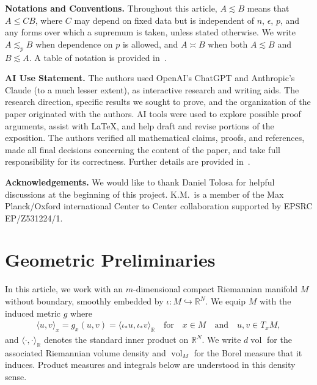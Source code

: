 \documentclass[11pt,reqno]{amsproc}
\numberwithin{equation}{section}
\newcommand{\R}{\mathbb{R}}
\newcommand{\ls}{\lesssim}
\newcommand{\vol}{\operatorname{vol}}
\newcommand{\dvol}{d\!\vol}
\newcommand{\andd}{\quad \text{and} \quad}
\theoremstyle{definition}
\theoremstyle{plain}
\begin{document}
\label{not:global_conventions}
\textbf{Notations and Conventions.}
    Throughout this article, $A\ls B$ means that $A\leq CB$, where $C$ may depend on fixed data but is independent of $n$, $\epsilon$, $p$, and any forms over which a supremum is taken, unless stated otherwise. We write $A\ls_p B$ when dependence on $p$ is allowed, and $A\asymp B$ when both $A\ls B$ and $B\ls A$. A table of notation is provided in~. \medskip


\textbf{AI Use Statement.}
The authors used OpenAI’s ChatGPT and Anthropic's Claude (to a much lesser extent), as interactive research and writing aids. The research direction, specific results we sought to prove, and the organization of the paper originated with the authors. AI tools were used to explore possible proof arguments, assist with \LaTeX, and help draft and revise portions of the exposition. The authors verified all mathematical claims, proofs, and references, made all final decisions concerning the content of the paper, and take full responsibility for its correctness. Further details are provided in~.\medskip



    \textbf{Acknowledgements.}
    We would like to thank Daniel Tolosa for helpful discussions at the beginning of this project. K.M.~is a member of the Max Planck/Oxford international Center to Center collaboration supported by EPSRC EP/Z531224/1.


    \section{Geometric Preliminaries} \label{sec:geometric_prelim}

    In this article, we work with an $m$-dimensional compact Riemannian manifold $M$ without boundary, smoothly embedded by $\iota: M \hookrightarrow \R^N$. We equip $M$ with the induced metric $g$ where
    \begin{align} \label{eq:riemannian_metric}
        \langle u, v \rangle_x = g_x(u,v) = \langle \iota_* u, \iota_* v \rangle_\R \quad \text{for} \quad x \in M \andd u, v \in T_x M,
    \end{align}
    and $\langle \cdot , \cdot \rangle_\R$ denotes the standard inner product on $\R^N$. We write $\dvol$ for the associated Riemannian volume density and $\vol_M$ for the Borel measure that it induces. Product measures and integrals below are understood in this density sense.
\end{document}
